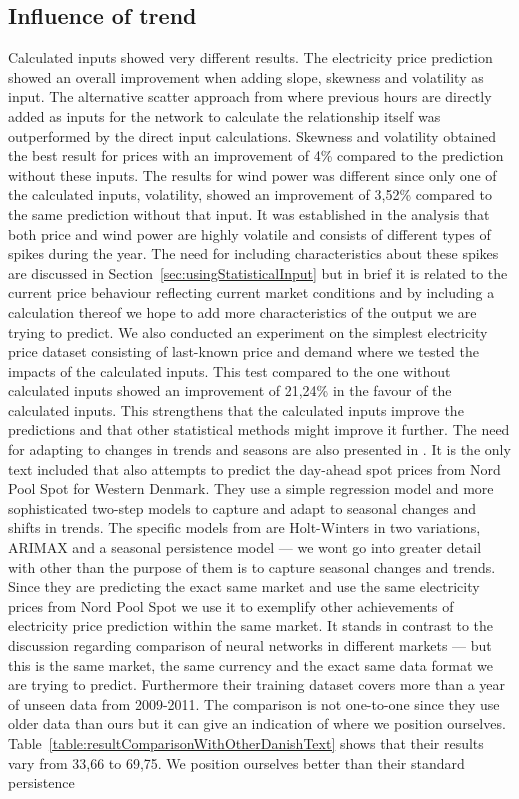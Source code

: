 \subsection{Influence of trend}
\label{sec:influenceOfTrendInCalcInput}
Calculated inputs showed very different results. The electricity price prediction showed an overall improvement when adding slope, skewness and volatility as input. The alternative scatter approach from \cite{singhal2011electricity} where previous hours are directly added as inputs for the network to calculate the relationship itself was outperformed by the direct input calculations. Skewness and volatility obtained the best result for prices with an improvement of 4\% compared to the prediction without these inputs. The results for wind power was different since only one of the calculated inputs, volatility, showed an improvement of 3,52\% compared to the same prediction without that input. It was established in the analysis that both price and wind power are highly volatile and consists of different types of spikes during the year. The need for including characteristics about these spikes are discussed in Section~\ref{sec:usingStatisticalInput} but in brief it is related to the current price behaviour reflecting current market conditions and by including a calculation thereof we hope to add more characteristics of the output we are trying to predict. We also conducted an experiment on the simplest electricity price dataset consisting of last-known price and demand where we tested the impacts of the calculated inputs. This test compared to the one without calculated inputs showed an improvement of 21,24\% in the favour of the calculated inputs. This strengthens that the calculated inputs improve the predictions and that other statistical methods might improve it further. The need for adapting to changes in trends and seasons are also presented in \cite{forecastingSpotPricesAccountingForWindPower}. It is the only text included that also attempts to predict the day-ahead spot prices from Nord Pool Spot for Western Denmark. They use a simple regression model and more sophisticated two-step models to capture and adapt to seasonal changes and shifts in trends. The specific models from \cite{forecastingSpotPricesAccountingForWindPower} are Holt-Winters in two variations, ARIMAX and a seasonal persistence model --- we wont go into greater detail with other than the purpose of them is to capture seasonal changes and trends. Since they are predicting the exact same market and use the same electricity prices from Nord Pool Spot we use it to exemplify other achievements of electricity price prediction within the same market. It stands in contrast to the discussion regarding comparison of neural networks in different markets --- but this is the same market, the same currency and the exact same data format we are trying to predict. Furthermore their training dataset covers more than a year of unseen data from 2009-2011. The comparison is not one-to-one since they use older data than ours but it can give an indication of where we position ourselves. Table~\ref{table:resultComparisonWithOtherDanishText} shows that their results vary from 33,66 to 69,75. We position ourselves better than their standard persistence 